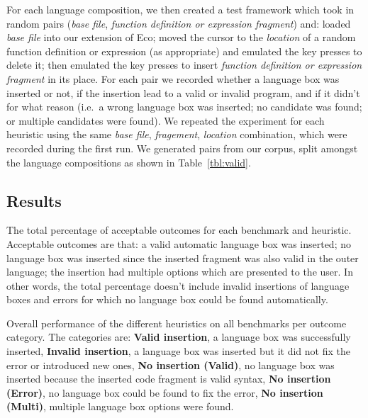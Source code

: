 \documentclass[sigplan,screen]{acmart}\settopmatter{printfolios=true,printccs=false,printacmref=false}
\begin{document}
For each language composition, we then created a test framework which took in
random pairs (\emph{base file}, \emph{function definition or expression
fragment}) and: loaded \emph{base file} into our
extension of Eco; moved the cursor to the \emph{location} of a random function definition or expression (as
appropriate) and emulated the key presses to delete it; then emulated the key
presses to insert \emph{function definition or expression fragment} in its
place. For each pair we recorded whether a language box was inserted or not, if the insertion
lead to a valid or invalid program, and if it didn't for what reason (i.e.~a wrong
language box was inserted; no candidate was found; or multiple candidates were found).
We repeated the experiment for each heuristic using the same \emph{base file}, \emph{fragement},
\emph{location} combination, which were recorded during the first run. We
generated \totalinsertions pairs from our corpus, split amongst the
language compositions as shown in Table~\ref{tbl:valid}.


\subsection{Results}

\begin{table}[tb]
    

    \vspace{7pt}
    \caption{The total percentage of acceptable outcomes for each benchmark and
    heuristic. Acceptable outcomes are that: a valid automatic language box
    was inserted; no language box was inserted since the inserted fragment
    was also valid in the outer language; the insertion had multiple options
    which are presented to the user. In other words, the total percentage
    doesn't include invalid insertions of language boxes and errors for which
    no language box could be found automatically.}
    \label{tbl:valid}
\end{table}

\begin{table}[tb]
    

    \vspace{7pt}
    \caption{Overall performance of the different
    heuristics on all benchmarks per outcome category. The categories are:
    \textbf{Valid insertion}, a language box was successfully inserted, \textbf{Invalid insertion},
    a language box was inserted but it did not fix the error or introduced new
    ones, \textbf{No insertion (Valid)}, no language box was inserted because the inserted
    code fragment is valid syntax, \textbf{No insertion (Error)}, no language box could be
    found to fix the error, \textbf{No insertion (Multi)}, multiple language box options
    were found.}
    \label{tbl:breakdown}
\end{table}
\end{document}

